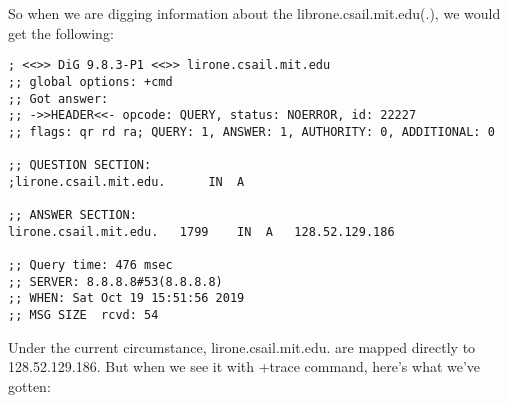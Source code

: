 \documentclass{article}
\begin{document}
\newpage

So when we are digging information about the librone.csail.mit.edu(.), we would get the following:

\begin{lstlisting}[numberstyle=\tiny\monaco,
        basicstyle=\small\monaco]
; <<>> DiG 9.8.3-P1 <<>> lirone.csail.mit.edu
;; global options: +cmd
;; Got answer:
;; ->>HEADER<<- opcode: QUERY, status: NOERROR, id: 22227
;; flags: qr rd ra; QUERY: 1, ANSWER: 1, AUTHORITY: 0, ADDITIONAL: 0

;; QUESTION SECTION:
;lirone.csail.mit.edu.		IN	A

;; ANSWER SECTION:
lirone.csail.mit.edu.	1799	IN	A	128.52.129.186

;; Query time: 476 msec
;; SERVER: 8.8.8.8#53(8.8.8.8)
;; WHEN: Sat Oct 19 15:51:56 2019
;; MSG SIZE  rcvd: 54

\end{lstlisting}

Under the current circumstance, lirone.csail.mit.edu. are mapped directly to 128.52.129.186. But when we see it with +trace command, here's what we've gotten:
\end{document}
